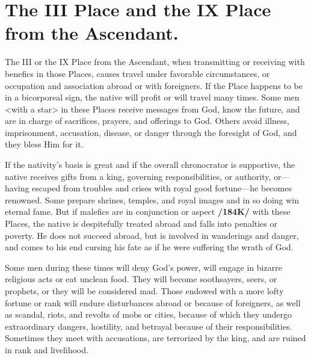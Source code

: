 \section{The III Place and the IX Place from the Ascendant.}

 
The III or the IX Place from the Ascendant, when transmitting or receiving with benefics in those Places, causes travel under favorable circumstances, or occupation and association abroad or with foreigners. If the Place happens to be in a bicorporeal sign, the native will profit or will travel many times. Some men <with a star> in these Places receive messages from God, know the future, and are in charge of sacrifices, prayers, and offerings to God. Others avoid illness, imprisonment, accusation, disease, or danger through the foresight of God, and they bless Him for it. 

If the nativity’s basis is great and if the overall chronocrator is supportive, the native receives gifts from a king, governing responsibilities, or authority, or—having escaped from troubles and crises with royal good fortune—he becomes renowned. Some prepare shrines, temples, and royal images and in so doing win eternal fame. But if malefics are in conjunction or aspect \textbf{/184K/} with these Places, the native is despitefully treated abroad and falls into penalties or poverty. He does not succeed abroad, but is involved in wanderings and danger, and comes to his end cursing his fate as if he were suffering the wrath of God. 

\enlargethispage{2\baselineskip}
Some men during these times will deny God’s power, will engage in bizarre religious acts or eat unclean food. They will become soothsayers, seers, or prophets, or they will be considered mad. Those endowed with a more lofty fortune or rank will endure disturbances abroad or because of foreigners, as well as scandal, riots, and revolts of mobs or cities, because of which they undergo extraordinary dangers, hostility, and betrayal because of their responsibilities. Sometimes they meet with accusations, are terrorized by the king, and are ruined in rank and livelihood.

\newpage